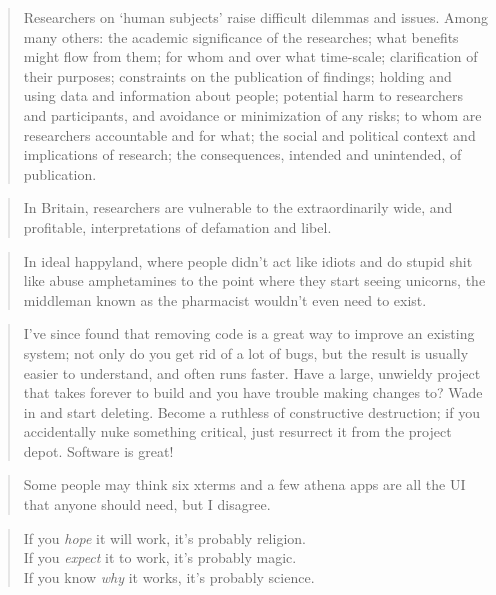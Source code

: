 \documentclass[a4paper]{article}
\begin{document}
\medskip
\begin{quote}
	Researchers on `human subjects' raise difficult dilemmas and issues.
	Among many others: the academic significance of the researches; what
	benefits might flow from them; for whom and over what time-scale;
	clarification of their purposes; constraints on the publication of
	findings; holding and using data and information about people; potential
	harm to researchers and participants, and avoidance or minimization
	of any risks; to whom are researchers accountable and for what; the
	social and political context and implications of research; the
	consequences, intended and unintended, of publication.
\end{quote}

\medskip
\begin{quote}
	In Britain, researchers are vulnerable to the extraordinarily wide, and
	profitable, interpretations of defamation and libel.~\cite{GPW2008}
\end{quote}

\medskip
\begin{quote}
	In ideal happyland, where people didn't act like idiots and do
	stupid shit like abuse amphetamines to the point where they start
	seeing unicorns, the middleman known as the pharmacist wouldn't
	even need to exist.~\cite{Excimer2008}
\end{quote}

\medskip
\begin{quote}
	I've since found that removing code is a great way to improve
	an existing system; not only do you get rid of a lot of bugs,
	but the result is usually easier to understand, and often runs
	faster. Have a large, unwieldy project that takes forever to
	build and you have trouble making changes to? Wade in and start
	deleting. Become a ruthless of constructive destruction; if
	you accidentally nuke something critical, just resurrect it
	from the project depot. Software is great!~\cite{Dyer2008b}
\end{quote}

\medskip
\begin{quote}
	Some people may think six xterms and a few athena apps are all the
	UI that anyone should need, but I disagree.~\cite{Carmack1999}
\end{quote}

\medskip
\begin{quote}
	If you \emph{hope} it will work, it's probably religion.\\
	If you \emph{expect} it to work, it's probably magic. \\
	If you know \emph{why} it works, it's probably science.~\cite{SDM2008a}
\end{quote}
\end{document}
